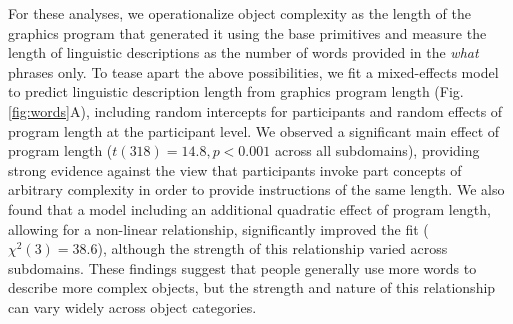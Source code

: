 
For these analyses, we operationalize object complexity as the length of the graphics program that generated it using the base primitives and measure the length of linguistic descriptions as the number of words provided in the \textit{what} phrases only.
To tease apart the above possibilities, we fit a mixed-effects model to predict linguistic description length from graphics program length (Fig. \ref{fig:words}A), including random intercepts for participants and random effects of program length at the participant level.
We observed a significant main effect of program length ($t(318)=14.8, p < 0.001$ across all subdomains), providing strong evidence against the view that participants invoke part concepts of arbitrary complexity in order to provide instructions of the same length. 
We also found that a model including an additional quadratic effect of program length, allowing for a non-linear relationship, significantly improved the fit ($\chi^2(3)=38.6$), although the strength of this relationship varied across subdomains.
These findings suggest that people generally use more words to describe more complex objects, but the strength and nature of this relationship can vary widely across object categories. 


